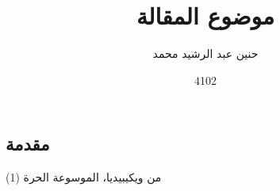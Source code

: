 \documentclass[11pt,a4paper]{report}
\title{
\Huge\textsc{موضوع المقالة}
}
\author{ حنين عبد الرشيد محمد  }
\date{4102}
\begin{document}
\begin{otherlanguage}{arabic}

\maketitle
\tableofcontents
\cleardoublepage
\section{مقدمة}
 \cleardoublepage

\end{otherlanguage}
\begin{thebibliography}{99}

   (1)
    من ويكيبيديا، الموسوعة الحرة
 
\end{thebibliography}
\end{document}
